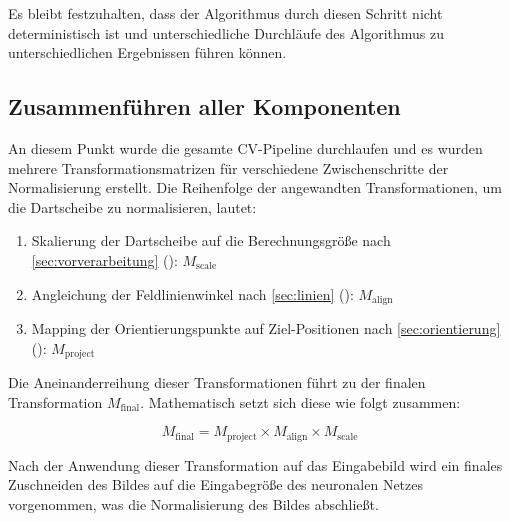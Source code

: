 
Es bleibt festzuhalten, dass der Algorithmus durch diesen Schritt nicht deterministisch ist und unterschiedliche Durchläufe des Algorithmus zu unterschiedlichen Ergebnissen führen können.

\subsection{Zusammenführen aller Komponenten}
\label{sec:zusammenfuehrung_aller_komponenten_cv}

An diesem Punkt wurde die gesamte CV-Pipeline durchlaufen und es wurden mehrere Transformationsmatrizen für verschiedene Zwischenschritte der Normalisierung erstellt. Die Reihenfolge der angewandten Transformationen, um die Dartscheibe zu normalisieren, lautet:

\begin{enumerate}
    \item Skalierung der Dartscheibe auf die Berechnungsgröße nach \autoref{sec:vorverarbeitung} (): $M_\text{scale}$
    \item Angleichung der Feldlinienwinkel nach \autoref{sec:linien} (): $M_\text{align}$
    \item Mapping der Orientierungspunkte auf Ziel-Positionen nach \autoref{sec:orientierung} (): $M_\text{project}$
\end{enumerate}

Die Aneinanderreihung dieser Transformationen führt zu der finalen Transformation $M_\text{final}$. Mathematisch setzt sich diese wie folgt zusammen:

\[ M_\text{final} = M_\text{project} \times M_\text{align} \times M_\text{scale} \]


Nach der Anwendung dieser Transformation auf das Eingabebild wird ein finales Zuschneiden des Bildes auf die Eingabegröße des neuronalen Netzes vorgenommen, was die Normalisierung des Bildes abschließt.

